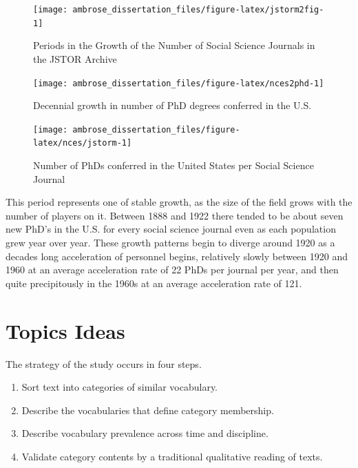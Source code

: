 \documentclass[]{book}
\providecommand{\tightlist}{%
  \setlength{\itemsep}{0pt}\setlength{\parskip}{0pt}}
\theoremstyle{definition}
\theoremstyle{definition}
\theoremstyle{definition}
\theoremstyle{remark}
\begin{document}
\begin{figure}

{\centering \texttt{[image: ambrose\_dissertation\_files/figure-latex/jstorm2fig-1]} 

}

\caption{Periods in the Growth of the Number of Social Science Journals in the JSTOR Archive}\label{fig:jstorm2fig}
\end{figure}

\begin{figure}

{\centering \texttt{[image: ambrose\_dissertation\_files/figure-latex/nces2phd-1]} 

}

\caption{Decennial growth in number of PhD degrees conferred in the U.S.}\label{fig:nces2phd}
\end{figure}

\begin{figure}

{\centering \texttt{[image: ambrose\_dissertation\_files/figure-latex/nces/jstorm-1]} 

}

\caption{Number of PhDs conferred in the United States per Social Science Journal}\label{fig:nces/jstorm}
\end{figure}

This period represents one of stable growth, as the size of the field
grows with the number of players on it. Between 1888 and 1922 there
tended to be about seven new PhD's in the U.S. for every social science
journal even as each population grew year over year. These growth
patterns begin to diverge around 1920 as a decades long acceleration of
personnel begins, relatively slowly between 1920 and 1960 at an average
acceleration rate of 22 PhDs per journal per year, and then quite
precipitously in the 1960s at an average acceleration rate of 121.

\hypertarget{topics-ideas}{%
\section{\texorpdfstring{Topics 
Ideas}{Topics  Ideas}}\label{topics-ideas}}

The strategy of the study occurs in four steps.

\begin{enumerate}
\def\labelenumi{\arabic{enumi}.}
\tightlist
\item
  Sort text into categories of similar vocabulary.
\item
  Describe the vocabularies that define category membership.
\item
  Describe vocabulary prevalence across time and discipline.
\item
  Validate category contents by a traditional qualitative reading of
  texts.
\end{enumerate}
\end{document}
